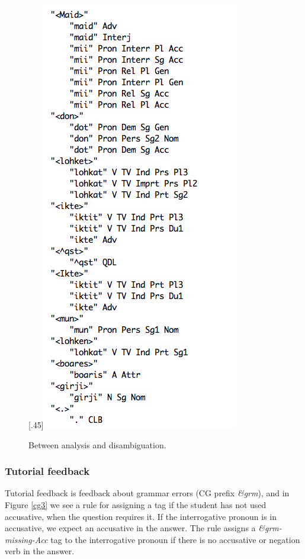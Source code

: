 \documentclass[11pt]{article}
\begin{document}
\begin{figure}[htb]
\begin{center}
\scalebox{.53}[.45]{\includegraphics{presentation/img/iktelohken3.png}}
\caption{Between analysis and disambiguation.}
\label{iktelohken}
\end{center}
\end{figure}

\subsubsection{Tutorial feedback} \label{tutorial}
Tutorial feedback is feedback about grammar errors (CG prefix \textit{\&grm}), and in Figure \ref{cg3} we see a rule for assigning a tag if the student has not used accusative, when the question requires it. If the interrogative pronoun is in accusative, we expect an accusative in the answer.
The rule assigns a \textit{\&grm-missing-Acc} tag to the interrogative pronoun if there is no accusative or negation verb in the answer.
\end{document}
